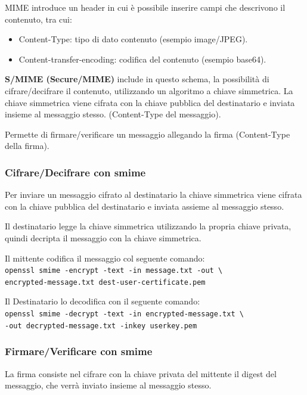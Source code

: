             MIME introduce un header in cui è possibile inserire campi che descrivono il contenuto, tra cui:
            \begin{itemize}
                \item Content-Type: tipo di dato contenuto (esempio image/JPEG).
                \item Content-transfer-encoding: codifica del contenuto (esempio base64).
            \end{itemize}

            \textbf{S/MIME (Secure/MIME)} include in questo schema, la possibilità di cifrare/decifrare il contenuto, utilizzando un algoritmo a chiave simmetrica. La chiave simmetrica viene cifrata con la chiave pubblica del destinatario e inviata insieme al messaggio stesso. (Content-Type del messaggio).

            Permette di firmare/verificare un messaggio allegando la firma (Content-Type della firma).

        \subsubsection{Cifrare/Decifrare con smime}
            Per inviare un messaggio cifrato al destinatario la chiave simmetrica viene cifrata con la chiave pubblica del destinatario e inviata assieme al messaggio stesso.
        
            Il destinatario legge la chiave simmetrica utilizzando la propria chiave privata, quindi decripta il messaggio con la chiave simmetrica.
        
            Il mittente codifica il messaggio col seguente comando:\\
            \verb|openssl smime -encrypt -text -in message.txt -out \|\\
            \verb|encrypted-message.txt dest-user-certificate.pem|

            Il Destinatario lo decodifica con il seguente comando:\\
            \verb|openssl smime -decrypt -text -in encrypted-message.txt \|\\
            \verb|-out decrypted-message.txt -inkey userkey.pem|

        \subsubsection{Firmare/Verificare con smime}
            La firma consiste nel cifrare con la chiave privata del mittente il digest del messaggio, che verrà inviato insieme al messaggio stesso.

